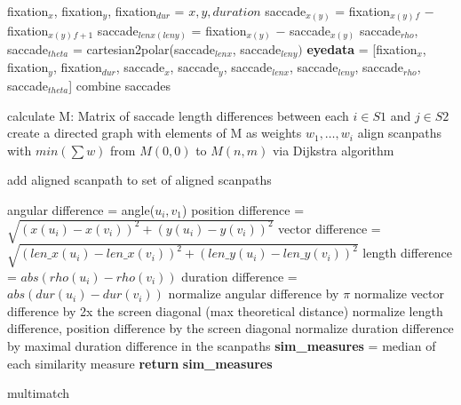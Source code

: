 \documentclass[a4paper, 12pt]{scrreprt}
\begin{document}
\begin{algorithm}[H]
	\begin{small}
		
		{ 
			{
				fixation$_x$, fixation$_y$, fixation$_{dur}$ = $x, y, duration$ \;
				saccade$_{x(y)}$ = fixation$_{x(y)}$$_{f}$ $-$ fixation$_{x(y)}$$_{f+1}$ \;
				saccade$_{lenx(leny)}$ = fixation$_{x(y)}$ $-$ saccade$_{x(y)}$\;
				saccade$_{rho}$, saccade$_{theta}$ = cartesian2polar(saccade$_{lenx}$, saccade$_{leny})$ \;
				\textbf{eyedata} = [fixation$_x$, fixation$_y$, fixation$_{dur}$, saccade$_x$, saccade$_y$, \newline saccade$_{lenx}$, saccade$_{leny}$, saccade$_{rho}$, saccade$_{theta}$]
			}
			{
				{
					{combine saccades}
				}
			}
		}
		{
			calculate M: Matrix of saccade length differences between each $i \in S1$ and  $j \in S2$\;
			create a directed graph with elements of M as weights $w_1, \ldots, w_i$\;
			align scanpaths with $min(\sum w)$ from $M(0,0)$ to $M(n,m)$ via Dijkstra algorithm\;
			
			add aligned scanpath to set of aligned scanpaths \;
			
			{
				angular difference = angle($u_i, v_1$)\;
				position difference = $\sqrt{(x(u_i) - x(v_i))^2 + (y(u_i) - y(v_i))^2}$ \;
				vector difference = $\sqrt{(len\_x(u_i) - len\_x(v_i))^2 + (len\_y(u_i) - len\_y(v_i))^2}$\;
				length difference = $abs(rho(u_i) - rho(v_i))$\;
				duration difference = $abs(dur(u_i)-dur(v_i))$ \;
			}
			normalize angular difference by $\pi$\;
			normalize vector difference by 2x the screen diagonal (max theoretical distance)\;
			normalize length difference, position difference by the screen diagonal\;
			normalize duration difference by maximal duration difference in the scanpaths\;
			\textbf{sim\_measures} = median of each similarity measure\;
			\textbf{return} \textbf{sim\_measures}
		}
		\caption{multimatch}
		\label{algo:multimatch}
	\end{small}
\end{algorithm}
\end{document}
